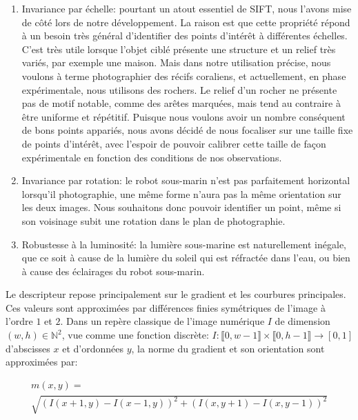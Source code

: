 \documentclass[
	a4paper, %
	10pt, %
	unnumberedsections, %
	twoside, %
]{LTJournalArticle}
\begin{document}
\begin{enumerate}
	\item Invariance par échelle: pourtant un atout essentiel de SIFT, nous l'avons mise
	      de côté lors de notre développement. La raison est que cette propriété
	      répond à un besoin très général d'identifier des points d'intérêt à différentes
	      échelles. C'est très utile lorsque l'objet ciblé présente une structure et
	      un relief très variés, par exemple une maison. Mais dans notre utilisation précise,
	      nous voulons à terme photographier des récifs coraliens, et actuellement, en
	      phase expérimentale, nous utilisons des rochers. Le relief d'un rocher ne présente
	      pas de motif notable, comme des arêtes marquées, mais tend au contraire à être
	      uniforme et répétitif. Puisque nous voulons avoir un nombre conséquent de bons points
	      appariés, nous avons décidé de nous focaliser sur une taille fixe de points d'intérêt,
	      avec l'espoir de pouvoir calibrer cette taille de façon expérimentale en fonction
	      des conditions de nos observations.
	\item Invariance par rotation: le robot sous-marin n'est pas parfaitement
	      horizontal lorsqu'il photographie, une même forme n'aura pas la même
	      orientation sur les deux images. Nous souhaitons donc pouvoir identifier un
	      point, même si son voisinage subit une rotation dans le plan de photographie.
	\item Robustesse à la luminosité: la lumière sous-marine est naturellement inégale,
	      que ce soit à cause de la lumière du soleil qui est réfractée dans l'eau, ou bien à
	      cause des éclairages du robot sous-marin.
\end{enumerate}


Le descripteur repose principalement sur le gradient et les courbures principales.
Ces valeurs sont approximées par différences finies symétriques de l'image à l'ordre $1$ et $2$.
Dans un repère classique de l'image numérique $I$ de dimension $(w, h) \in \mathbb{N}^2$,
vue comme une fonction discrète:
$I: \llbracket 0, w-1 \rrbracket \times \llbracket 0, h-1 \rrbracket \rightarrow [0, 1]$
d'abscisses $x$ et d'ordonnées $y$, la norme du gradient
et son orientation sont approximées par:

\begin{multline}
	m(x, y) = \\
	\sqrt{(I(x+1, y) - I(x-1,y))^2 + (I(x,y+1)-I(x,y-1))^2}
\end{multline}
\end{document}
